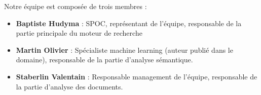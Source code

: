 Notre équipe est composée de trois membres :
\begin {itemize}
\item \textbf {Baptiste Hudyma} :
SPOC, représentant de l'équipe, responsable de la partie principale du moteur de recherche

\item \textbf {Martin Olivier} : 
Spécialiste machine learning (auteur publié dans le domaine), responsable de la partie d'analyse sémantique.


\item \textbf {Staberlin Valentain} :
Responsable management de l'équipe, responsable de la partie d'analyse des documents.

\end {itemize}
